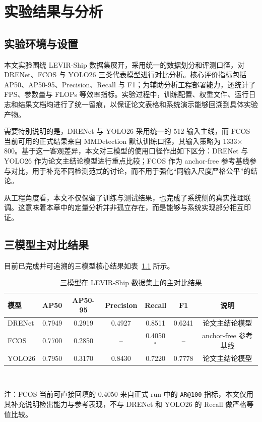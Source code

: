 
\chapter{实验结果与分析}
\label{ch:experiment}

\section{实验环境与设置}

本文实验围绕 LEVIR-Ship 数据集展开，采用统一的数据划分和评测口径，对 DRENet、FCOS 与 YOLO26 三类代表模型进行对比分析。核心评价指标包括 AP50、AP50-95、Precision、Recall 与 F1；为辅助分析工程部署能力，还统计了 FPS、参数量与 FLOPs 等效率指标。实验过程中，训练配置、权重文件、运行日志和结果文档均进行了统一留痕，以保证论文表格和系统演示能够回溯到具体实验产物。

需要特别说明的是，DRENet 与 YOLO26 采用统一的 512 输入主线，而 FCOS 当前可用的正式结果来自 MMDetection 默认训练口径，其输入策略为 1333\(\times\)800。基于这一客观差异，本文对三模型的使用口径作出如下区分：DRENet 与 YOLO26 作为论文主结论模型进行重点比较；FCOS 作为 anchor-free 参考基线参与对比，用于补充不同检测范式的讨论，而不用于强化“同输入尺度严格公平”的结论。

从工程角度看，本文不仅保留了训练与测试结果，也完成了系统侧的真实推理联调。这意味着本章中的定量分析并非孤立存在，而是能够与系统实现部分相互印证。

\section{三模型主对比结果}

目前已完成并可追溯的三模型核心结果如表~\ref{tab:ch4_baselines} 所示。

\begin{table}[htbp]
  \centering
  \caption{三模型在 LEVIR-Ship 数据集上的主对比结果}
  \label{tab:ch4_baselines}
  \begin{tabular}{lcccccc}
    \toprule
    模型 & AP50 & AP50-95 & Precision & Recall & F1 & 说明 \\
    \midrule
    DRENet & 0.7949 & 0.2919 & 0.4927 & 0.8511 & 0.6241 & 论文主结论模型 \\
    FCOS & 0.7700 & 0.2850 & -- & 0.4050$^{*}$ & -- & anchor-free 参考基线 \\
    YOLO26 & 0.7950 & 0.3170 & 0.8430 & 0.7220 & 0.7778 & 论文主结论模型 \\
    \bottomrule
  \end{tabular}
  \\
  \parbox{0.92\textwidth}{\footnotesize 注：FCOS 当前可直接回填的 0.4050 来自正式 run 中的 \texttt{AR@100} 指标，本文仅用其补充说明检出能力与参考表现，不与 DRENet 和 YOLO26 的 Recall 做严格等值比较。}
\end{table}

